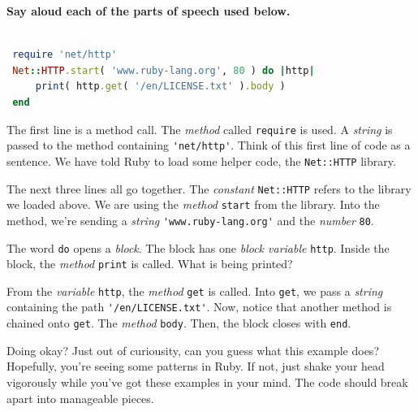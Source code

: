 \documentclass[10pt,twoside]{report}
\begin{document}
{\bf Say aloud each of the parts of speech used below.}


\begin{lstlisting}[basicstyle=\ttfamily\color{basiccolor},
    commentstyle = \ttfamily\color{commentcolor},
    keywordstyle=\ttfamily\color{keywordscolor},
    stringstyle=\color{stringcolor},
    language=Ruby,
    basicstyle=\small\ttfamily,
    showstringspaces=false,
  ]

 require 'net/http' 
 Net::HTTP.start( 'www.ruby-lang.org', 80 ) do |http| 
     print( http.get( '/en/LICENSE.txt' ).body ) 
 end

\end{lstlisting}


The first line is a method call.  The {\em method} called
\lstinline[breaklines=true]|require| is used.  A {\em string} is
passed to the method containing
\lstinline[breaklines=true]|'net/http'|.  Think of this first line of
code as a sentence.  We have told Ruby to load some helper code, the
\lstinline[breaklines=true]|Net::HTTP| library.

The next three lines all go together.  The {\em constant}
\lstinline[breaklines=true]|Net::HTTP| refers to the library we loaded
above. We are using the {\em method}
\lstinline[breaklines=true]|start| from the library.  Into the method,
we're sending a {\em string}
\lstinline[breaklines=true]|'www.ruby-lang.org'| and the {\em number}
\lstinline[breaklines=true]|80|.

The word \lstinline[breaklines=true]|do| opens a {\em block}.  The
block has one {\em block variable} \lstinline[breaklines=true]|http|.
Inside the block, the {\em method} \lstinline[breaklines=true]|print|
is called.  What is being printed?

From the {\em variable} \lstinline[breaklines=true]|http|, the {\em
  method} \lstinline[breaklines=true]|get| is called.  Into
\lstinline[breaklines=true]|get|, we pass a {\em string} containing
the path \lstinline[breaklines=true]|'/en/LICENSE.txt'|.  Now, notice
that another method is chained onto \lstinline[breaklines=true]|get|.
The {\em method} \lstinline[breaklines=true]|body|.  Then, the block
closes with \lstinline[breaklines=true]|end|.

Doing okay?  Just out of curiousity, can you guess what this example
does?  Hopefully, you're seeing some patterns in Ruby.  If not, just
shake your head vigorously while you've got these examples in your
mind.  The code should break apart into manageable pieces.
\end{document}
